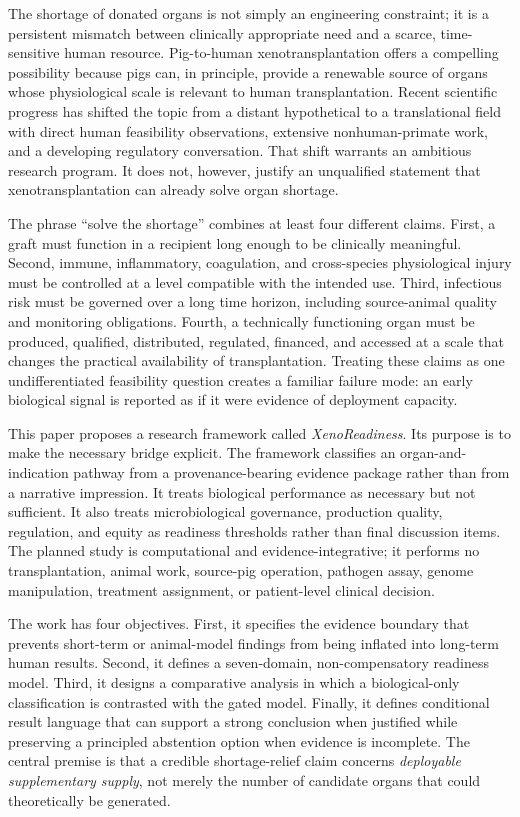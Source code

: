 \documentclass[conference]{IEEEtran}
\newcommand{\xeno}{xenotransplantation}
\begin{document}
The shortage of donated organs is not simply an engineering constraint; it is a persistent mismatch between clinically appropriate need and a scarce, time-sensitive human resource. Pig-to-human \xeno{} offers a compelling possibility because pigs can, in principle, provide a renewable source of organs whose physiological scale is relevant to human transplantation. Recent scientific progress has shifted the topic from a distant hypothetical to a translational field with direct human feasibility observations, extensive nonhuman-primate work, and a developing regulatory conversation. That shift warrants an ambitious research program. It does not, however, justify an unqualified statement that \xeno{} can already solve organ shortage.

The phrase ``solve the shortage'' combines at least four different claims. First, a graft must function in a recipient long enough to be clinically meaningful. Second, immune, inflammatory, coagulation, and cross-species physiological injury must be controlled at a level compatible with the intended use. Third, infectious risk must be governed over a long time horizon, including source-animal quality and monitoring obligations. Fourth, a technically functioning organ must be produced, qualified, distributed, regulated, financed, and accessed at a scale that changes the practical availability of transplantation. Treating these claims as one undifferentiated feasibility question creates a familiar failure mode: an early biological signal is reported as if it were evidence of deployment capacity.

This paper proposes a research framework called \emph{XenoReadiness}. Its purpose is to make the necessary bridge explicit. The framework classifies an organ-and-indication pathway from a provenance-bearing evidence package rather than from a narrative impression. It treats biological performance as necessary but not sufficient. It also treats microbiological governance, production quality, regulation, and equity as readiness thresholds rather than final discussion items. The planned study is computational and evidence-integrative; it performs no transplantation, animal work, source-pig operation, pathogen assay, genome manipulation, treatment assignment, or patient-level clinical decision.

The work has four objectives. First, it specifies the evidence boundary that prevents short-term or animal-model findings from being inflated into long-term human results. Second, it defines a seven-domain, non-compensatory readiness model. Third, it designs a comparative analysis in which a biological-only classification is contrasted with the gated model. Finally, it defines conditional result language that can support a strong conclusion when justified while preserving a principled abstention option when evidence is incomplete. The central premise is that a credible shortage-relief claim concerns \emph{deployable supplementary supply}, not merely the number of candidate organs that could theoretically be generated.
\end{document}
